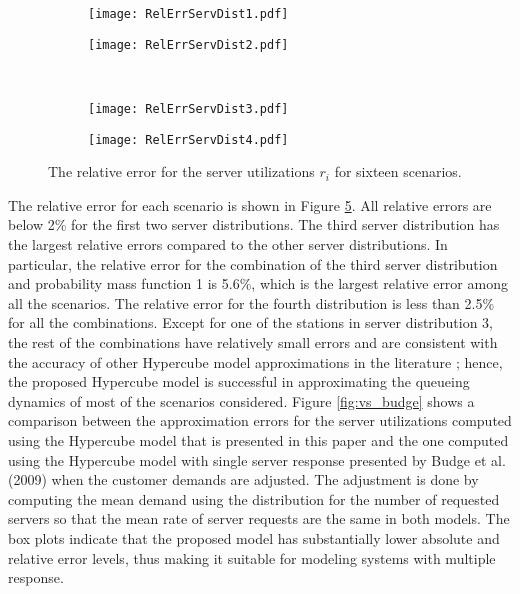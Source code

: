 \documentclass[11pt]{article}\topmargin 0mm
\begin{document}
\begin{figure}
        \centering
        \begin{subfigure}[b]{0.45\textwidth}
                \texttt{[image: RelErrServDist1.pdf]}
                \label{fig:rel_err1}
        \end{subfigure}
        \begin{subfigure}[b]{0.45\textwidth}
                \texttt{[image: RelErrServDist2.pdf]}
                \label{fig:rel_err2}
        \end{subfigure}
        \\
        \begin{subfigure}[b]{0.45\textwidth}
                \texttt{[image: RelErrServDist3.pdf]}
                \label{fig:rel_err3}
        \end{subfigure}
        \begin{subfigure}[b]{0.45\textwidth}
                \texttt{[image: RelErrServDist4.pdf]}
                \label{fig:rel_err4}
        \end{subfigure}
        \caption{The relative error for the server utilizations $r_i$ for sixteen scenarios.}\label{fig:rel_err}
\end{figure}


The relative error for each scenario is shown in Figure
\ref{fig:rel_err}. All relative errors are below 2\% for the
first two server distributions. The third server distribution
has the largest relative errors compared to the other server
distributions. In particular, the relative error for the
combination of the third server distribution and probability
mass function 1 is 5.6\%, which is the largest relative error
among all the scenarios. The relative error for the fourth
distribution is less than 2.5\% for all the combinations.
Except for one of the stations in server distribution 3, the
rest of the combinations have relatively small errors and are
consistent with the accuracy of other Hypercube model
approximations in the literature \citep{Budge-etal-09}; hence,
the proposed Hypercube model is successful in approximating the
queueing dynamics of most of the scenarios considered. {\color{blue}Figure \ref{fig:vs_budge} shows a comparison between the approximation errors for the server utilizations computed using the Hypercube model that is presented in this paper and the one computed using the Hypercube model with single server response presented by Budge et al. (2009) when the customer demands are adjusted. The adjustment is done by computing the mean demand using the distribution for the number of requested servers so that the mean rate of server requests are the same in both models. The box plots indicate that the proposed model has substantially lower absolute and relative error levels, thus making it suitable for modeling systems with multiple response.}
\end{document}
